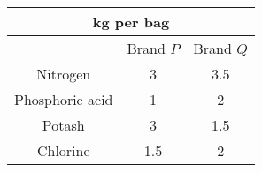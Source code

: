\begin{center}
\begin{tabular}{|c|c|c|}
\hline
\multicolumn{3}{|c|}{kg per bag}\\ \hline
	&Brand $P$	&Brand $Q$\\ \hline
Nitrogen	&3	&3.5\\ \hline
Phosphoric acid	&1	&2\\ \hline
Potash	&3	&1.5\\ \hline
Chlorine	&1.5	&2\\ \hline
\end{tabular}
\end{center}

